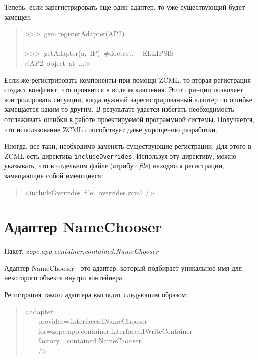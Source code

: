 \documentclass[a4paper,openany,twoside,final]{book}
\providecommand*{\DUroletitlereference}[1]{\textsl{#1}}
\begin{document}
Теперь, если зарегистрировать еще один адаптер, то уже существующий
будет замещен.

\begin{quote}{\ttfamily \raggedright \noindent
>{}>{}>~gsm.registerAdapter(AP2)\\
~\\
>{}>{}>~getAdapter(a,~IP)~\#doctest:~+ELLIPSIS\\
<AP2~object~at~...>
}
\end{quote}

Если же регистрировать компоненты при помощи ZCML, то вторая
регистрация создаст конфликт, что проявится в виде исключения.  Этот
принцип позволяет контролировать ситуации, когда нужный
зарегистрированный адаптер по ошибке замещается каким-то другим.  В
результате удается избегать необходимость отслеживать ошибки в работе
проектируемой программной системы.  Получается, что использование ZCML
способствует даже упрощению разработки.

Иногда, все-таки, необходимо заменять существующие регистрации.  Для
этого в ZCML есть директива \texttt{includeOverrides}.  Используя эту
директиву, можно указывать, что в отдельном файле (атрибут \DUroletitlereference{file})
находятся регистрации, замещающие собой имеющиеся:

\begin{quote}{\ttfamily \raggedright \noindent
<includeOverrides~file=\textquotedbl{}overrides.zcml\textquotedbl{}~/>
}
\end{quote}


\section{Адаптер NameChooser%
  \label{namechooser}%
}

Пакет: \DUroletitlereference{zope.app.container.contained.NameChooser}

Адаптер NameChooser - это адаптер, который подбирает уникальное имя
для некоторого объекта внутри контейнера.

Регистрация такого адаптера выглядит следующим образом:

\begin{quote}{\ttfamily \raggedright \noindent
<adapter\\
~~~~provides=\textquotedbl{}.interfaces.INameChooser\textquotedbl{}\\
~~~~for=\textquotedbl{}zope.app.container.interfaces.IWriteContainer\textquotedbl{}\\
~~~~factory=\textquotedbl{}.contained.NameChooser\textquotedbl{}\\
~~~~/>
}
\end{quote}
\end{document}
